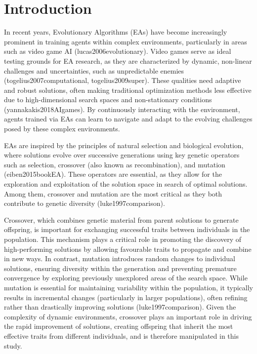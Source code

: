 
\section{Introduction}\label{sec:introduction}
In recent years, Evolutionary Algorithms (EAs) have become increasingly prominent in training agents within complex environments, particularly in areas such as video game AI (lucas2006evolutionary).
Video games serve as ideal testing grounds for EA research, as they are characterized by dynamic, non-linear challenges and uncertainties, such as unpredictable enemies (togelius2007computational, togelius2009super).
These qualities need adaptive and robust solutions, often making traditional optimization methods less effective due to high-dimensional search spaces and non-stationary conditions (yannakakis2018AIgames).
By continuously interacting with the environment, agents trained via EAs can learn to navigate and adapt to the evolving challenges posed by these complex environments.

EAs are inspired by the principles of natural selection and biological evolution, where solutions evolve over successive generations using key genetic operators such as selection, crossover (also known as recombination), and mutation (eiben2015bookEA).
These operators are essential, as they allow for the exploration and exploitation of the solution space in search of optimal solutions.
Among them, crossover and mutation are the most critical as they both contribute to genetic diversity (luke1997comparison).

Crossover, which combines genetic material from parent solutions to generate offspring, is important for exchanging successful traits between individuals in the population.
This mechanism plays a critical role in promoting the discovery of high-performing solutions by allowing favourable traits to propagate and combine in new ways.
In contrast, mutation introduces random changes to individual solutions, ensuring diversity within the generation and preventing premature convergence by exploring previously unexplored areas of the search space.
While mutation is essential for maintaining variability within the population, it typically results in incremental changes (particularly in larger populations), often refining rather than drastically improving solutions (luke1997comparison).
Given the complexity of dynamic environments, crossover plays an important role in driving the rapid improvement of solutions, creating offspring that inherit the most effective traits from different individuals, and is therefore manipulated in this study.

